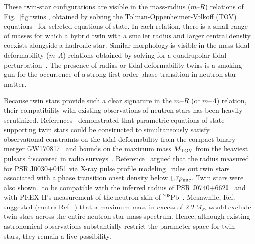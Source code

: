 \documentclass[aps,prd,twocolumn,superscriptaddress,nofootinbib]{revtex4-1}
\newcommand{\Msun}{\ensuremath{\,M_{\odot}}}
\begin{document}
These twin-star configurations are visible in the mass-radius ($m$--$R$) relations of Fig.~\ref{fig:twins}, obtained by solving the Tolman-Oppenheimer-Volkoff (TOV) equations~\cite{OppenheimerVolkoff1939,Tolman1939} for selected equations of state. In each relation, there is a small range of masses for which a hybrid twin with a smaller radius and larger central density coexists alongside a hadronic star. Similar morphology is visible in the mass-tidal deformability ($m$--$\Lambda$) relations obtained by solving for a quadrupolar tidal perturbation~\cite{FlanaganHinderer2008,Hinderer2008,LandryPoisson2014}. The presence of radius or tidal deformability twins is a smoking gun for the occurrence of a strong first-order phase transition in neutron star matter. 

Because twin stars provide such a clear signature in the $m$--$R$ (or $m$--$\Lambda$) relation, their compatibility with existing observations of neutron stars has been heavily scrutinized. References~\cite{PaschalidisYagi2018,MontanaTolos2019,ChristianZacchi2019,PangDietrich2020,WangShi2022} demonstrated that parametric equations of state supporting twin stars could be constructed to simultaneously satisfy observational constraints on the tidal deformability from the compact binary merger GW170817~\cite{GW170817,LVC_GW170817source,LVC_GW170817eos} and bounds on the maximum mass $M_{\rm TOV}$ from the heaviest pulsars discovered in radio surveys~\cite{AntoniadisFreire2013,CromartieFonseca2020,FonsecaCromartie2021}. Reference~\cite{ChristianSchaffner-Bielich2020} argued that the radius measured for PSR J0030+0451 via X-ray pulse profile modeling~\cite{RileyWatts2019,MillerLamb2019} rules out twin stars associated with a phase transition onset density below $1.7\rho_{\rm nuc}$. Twin stars were also shown~\cite{ChristianSchaffner-Bielich2022} to be compatible with the inferred radius of PSR J0740+6620~\cite{RileyWatts2021,MillerLamb2021} and~\cite{LiSedrakian2021} with PREX-II's measurement of the neutron skin of $^{208}$Pb~\cite{AdhikariAlbataineh2021}. Meanwhile, Ref.~\cite{ChristianSchaffner-Bielich2021_Mmax} suggested (contra Ref.~\cite{TsaloukidisKoliogiannis2022}) that a maximum mass in excess of $2.2\Msun$ would exclude twin stars across the entire neutron star mass spectrum. Hence, although existing astronomical observations substantially restrict the parameter space for twin stars, they remain a live possibility.
\end{document}
